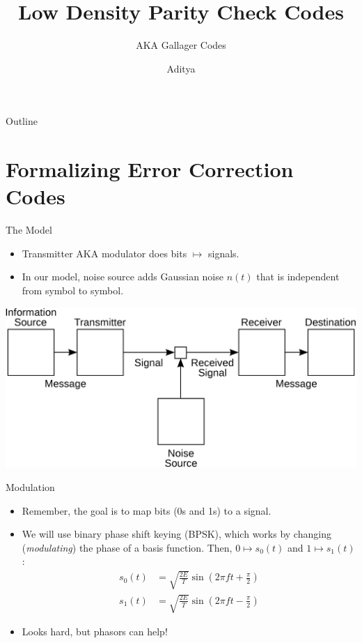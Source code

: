 \documentclass[aspectratio=1610, 10pt]{beamer}
\author{Aditya}
\date{}
\title{Low Density Parity Check Codes}
\subtitle{AKA Gallager Codes}
\begin{document}
\maketitle
\begin{frame}{Outline}
\tableofcontents
\end{frame}



\section{Formalizing Error Correction Codes}
\label{sec:org2c6c725}

\begin{frame}[label={sec:orgd526036}]{The Model}
\begin{itemize}
\item Transmitter AKA modulator does bits \(\mapsto\) signals.
\item In our model, noise source adds Gaussian noise \(n(t)\) that is
independent from symbol to symbol.
\end{itemize}
\begin{center}
\includegraphics[width=.9\linewidth]{./shannon_gen_comm_sys.png}
\end{center}
\end{frame}

\begin{frame}[label={sec:orgba6f001}]{Modulation}
\begin{itemize}
\item Remember, the goal is to map bits (0s and 1s) to a signal.
\item We will use binary phase shift keying (BPSK), which works by
changing (\emph{modulating}) the phase of a basis function. Then,
\(0\mapsto s_0(t)\) and \(1\mapsto s_1(t)\):
\begin{align*}
s_0(t) &= \sqrt{\frac{2E}{T}} \sin{\left(2\pi ft + \frac{\pi}{2} \right)}\\
s_1(t) &= \sqrt{\frac{2E}{T}} \sin{\left(2\pi ft - \frac{\pi}{2} \right)}
\end{align*}
\item Looks hard, but phasors can help!
\end{itemize}
\end{frame}
\end{document}
